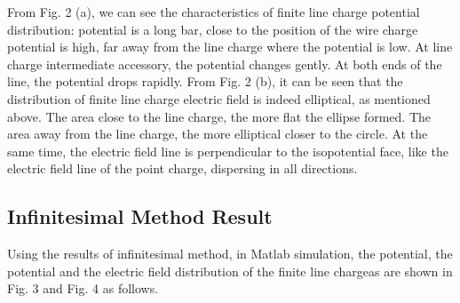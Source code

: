 \documentclass[journal,twocolumn,letterpaper]{IEEEJERM}
\begin{document}
From Fig. 2 (a), we can see the characteristics of finite line charge potential distribution: potential is a long bar, close to the position of the wire charge potential is high, far away from the line charge where the potential is low. At line charge intermediate accessory, the potential changes gently. At both ends of the line, the potential drops rapidly.
From Fig. 2 (b), it can be seen that the distribution of finite line charge electric field is indeed elliptical, as mentioned above. The area close to the line charge, the more flat the ellipse formed. The area away from the line charge, the more elliptical closer to the circle. At the same time, the electric field line is perpendicular to the isopotential face, like the electric field line of the point charge, dispersing in all directions.

\subsection{Infinitesimal Method Result}
Using the results of infinitesimal method, in Matlab simulation, the potential, the potential and the electric field distribution of the finite line chargeas are shown in Fig. 3 and Fig. 4 as follows.
\end{document}
